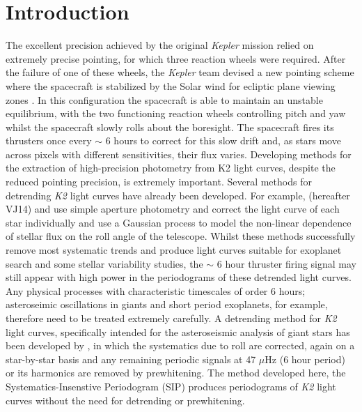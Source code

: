 \documentclass[useAMS, usenatbib, preprint, 12pt]{aastex}
\begin{document}
\section{Introduction}
\label{Introduction}

The excellent precision achieved by the original {\it Kepler} mission relied
on extremely precise pointing, for which three reaction wheels were required.
After the failure of one of these wheels, the {\it Kepler} team devised a new
pointing scheme where the spacecraft is stabilized by the Solar wind for
ecliptic plane viewing zones \citep{Howell2014}.
In this configuration the spacecraft is able to maintain an unstable
equilibrium, with the two functioning reaction wheels controlling pitch and
yaw whilst the spacecraft slowly rolls about the boresight.
The spacecraft fires its thrusters once every $\sim$ 6 hours
\citep{Vanderburg2014} to correct for
this slow drift and, as stars move across pixels with different sensitivities,
their flux varies.
Developing methods for the extraction of high-precision photometry from K2
light curves, despite the reduced pointing precision, is extremely
important.
Several methods for detrending {\it K2} light curves have already been
developed.
For example, \citet{Vanderburg2014} (hereafter VJ14) and \citet{Crossfield2015}
use simple aperture photometry and correct the light curve of each star
individually and \citet{Aigrain2015} use a Gaussian process to model the
non-linear dependence of stellar flux on the roll angle of the telescope.
Whilst these methods successfully remove most systematic trends and
produce light curves suitable for exoplanet search and some stellar
variability studies, the $\sim$ 6 hour thruster firing signal may still appear
with high power in the periodograms of these detrended light curves.
Any physical processes with characteristic timescales of order
6 hours; asteroseimic oscillations in giants and short period
exoplanets, for example, therefore need to be treated extremely carefully.
A detrending method for {\it K2} light curves, specifically intended for the
asteroseismic analysis of giant stars has been developed by \citet{Lund2015},
in which the systematics due to roll are corrected, again on
a star-by-star basis and any remaining periodic signals at 47 $\mu$Hz (6 hour
period) or its harmonics are removed by prewhitening.
The method developed here, the Systematics-Insenstive Periodogram (SIP)
produces periodograms of {\it K2} light curves without the need for detrending
or prewhitening.
\end{document}
